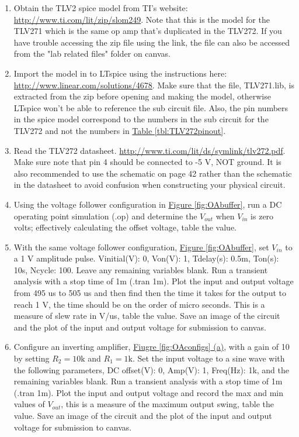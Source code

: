 \begin{enumerate}
	\item Obtain the TLV2 spice model from TI's website: \url{http://www.ti.com/lit/zip/slom249}. Note that this is the model for the TLV271 which is the same op amp that's duplicated in the TLV272. If you have trouble accessing the zip file using the link, the file can also be accessed from the "lab related files" folder on canvas.
	\item Import the model in to LTspice using the instructions here: \url{http://www.linear.com/solutions/4678}. Make sure that the file, TLV271.lib, is extracted from the zip before opening and making the model, otherwise LTspice won't be able to reference the sub circuit file. Also, the pin numbers in the spice model correspond to the numbers in the sub circuit for the TLV272 and not the numbers in \hyperref[tbl:TLV272pinout]{Table \ref*{tbl:TLV272pinout}}.
	\item Read the TLV272 datasheet. \url{http://www.ti.com/lit/ds/symlink/tlv272.pdf}. Make sure note that pin 4 should be connected to -5 V, NOT ground. It is also recommended to use the schematic on page 42 rather than the schematic in the datasheet to avoid confusion when constructing your physical circuit.
	\item Using the voltage follower configuration in \hyperref[fig:OAbuffer]{Figure \ref*{fig:OAbuffer}}, run a DC operating point simulation (.op) and determine the $V_{out}$ when $V_{in}$ is zero volts; effectively calculating the offset voltage, table the value. 
	\item With the same voltage follower configuration, \hyperref[fig:OAbuffer]{Figure \ref*{fig:OAbuffer}}, set $V_{in}$ to a 1 V amplitude pulse. Vinitial(V): 0, Von(V): 1, Tdelay(s): 0.5m, Ton(s): 10s, Ncycle: 100. Leave any remaining variables blank. Run a transient analysis with a stop time of 1m (.tran 1m). Plot the input and output voltage from 495 us to 505 us and then find then the time it takes for the output to reach 1 V, the time should be on the order of micro seconds. This is a measure of slew rate in V/us, table the value. Save an image of the circuit and the plot of the input and output voltage for submission to canvas. \label{itm:5ssec1itm5}
	\item Configure an inverting amplifier, \hyperref[fig:OAconfigs]{Fiugre \ref*{fig:OAconfigs} (a)}, with a gain of 10 by setting $R_2=10\mathrm{k}$ and $R_1 = 1 \mathrm{k}$. Set the input voltage to a sine wave with the following parameters, DC offset(V): 0, Amp(V): 1, Freq(Hz): 1k, and the remaining variables blank. Run a transient analysis with a stop time of 1m (.tran 1m). Plot the input and output voltage and record the max and min values of $V_{out}$, this is a measure of the maximum output swing, table the value. Save an image of the circuit and the plot of the input and output voltage for submission to canvas. \label{itm:5ssec1itm6}

\end{enumerate}
